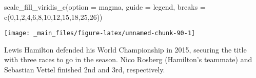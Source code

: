 \documentclass[
]{book}
\newenvironment{Shaded}{\begin{snugshade}}{\end{snugshade}}
\newcommand{\AttributeTok}[1]{\textcolor[rgb]{0.77,0.63,0.00}{#1}}
\newcommand{\DecValTok}[1]{\textcolor[rgb]{0.00,0.00,0.81}{#1}}
\newcommand{\FunctionTok}[1]{\textcolor[rgb]{0.00,0.00,0.00}{#1}}
\newcommand{\NormalTok}[1]{#1}
\newcommand{\StringTok}[1]{\textcolor[rgb]{0.31,0.60,0.02}{#1}}
\begin{document}
\begin{Shaded}
\begin{Highlighting}[]
  \FunctionTok{scale\_fill\_viridis\_c}\NormalTok{(}\AttributeTok{option =} \StringTok{\textquotesingle{}magma\textquotesingle{}}\NormalTok{,}
                       \AttributeTok{guide =} \StringTok{\textquotesingle{}legend\textquotesingle{}}\NormalTok{,}
                       \AttributeTok{breaks =} \FunctionTok{c}\NormalTok{(}\DecValTok{0}\NormalTok{,}\DecValTok{1}\NormalTok{,}\DecValTok{2}\NormalTok{,}\DecValTok{4}\NormalTok{,}\DecValTok{6}\NormalTok{,}\DecValTok{8}\NormalTok{,}\DecValTok{10}\NormalTok{,}\DecValTok{12}\NormalTok{,}\DecValTok{15}\NormalTok{,}\DecValTok{18}\NormalTok{,}\DecValTok{25}\NormalTok{,}\DecValTok{26}\NormalTok{))}
\end{Highlighting}
\end{Shaded}

\begin{center}\texttt{[image: \_main\_files/figure-latex/unnamed-chunk-90-1]} \end{center}

Lewis Hamilton defended his World Championship in 2015, securing the title with three races to go in the season. Nico Rosberg (Hamilton's teammate) and Sebastian Vettel finished 2nd and 3rd, respectively.
\end{document}
